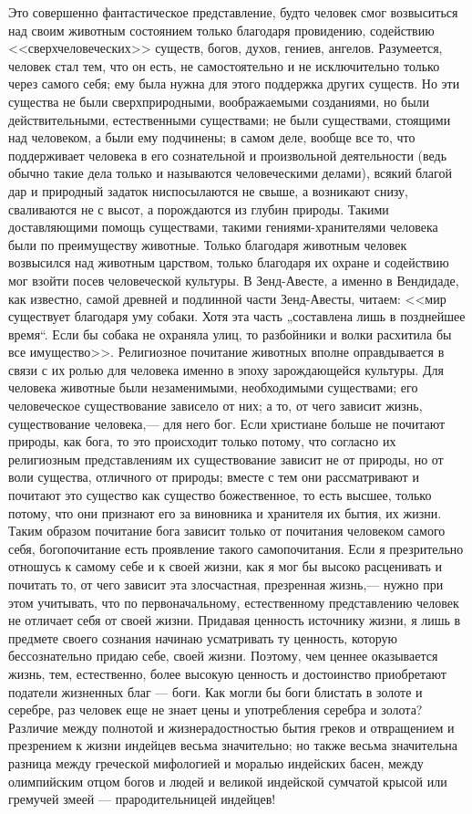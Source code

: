 \documentclass[12pt]{article}
\begin{document}
Это совершенно фантастическое представление, будто человек смог возвыситься над своим животным состоянием только благодаря провидению, содействию <<сверхчеловеческих>> существ, богов, духов, гениев, ангелов. Разумеется, человек стал тем, что он есть, не самостоятельно и не исключительно только через самого себя; ему была нужна для этого поддержка других существ. Но эти существа не были сверхприродными, воображаемыми созданиями, но были действительными, естественными существами; не были существами, стоящими над человеком, а были ему подчинены; в самом деле, вообще все то, что поддерживает человека в его сознательной и произвольной деятельности (ведь обычно такие дела только и называются человеческими делами), всякий благой дар и природный задаток ниспосылаются не свыше, а возникают снизу, сваливаются не с высот, а порождаются из глубин природы. Такими доставляющими помощь существами, такими гениями-хранителями человека были по преимуществу животные. Только благодаря животным человек возвысился над животным царством, только благодаря их охране и содействию мог взойти посев человеческой культуры. В Зенд-Авесте, а именно в Вендидаде, как известно, самой древней и подлинной части Зенд-Авесты, читаем: <<мир существует благодаря уму собаки. Хотя эта часть „составлена лишь в позднейшее время“. Если бы собака не охраняла улиц, то разбойники и волки расхитила бы все имущество>>. Религиозное почитание животных вполне оправдывается в связи с их ролью для человека именно в эпоху зарождающейся культуры. Для человека животные были незаменимыми, необходимыми существами; его человеческое существование зависело от них; а то, от чего зависит жизнь, существование человека,--- для него бог. Если христиане больше не почитают природы, как бога, то это происходит только потому, что согласно их религиозным представлениям их существование зависит не от природы, но от воли существа, отличного от природы; вместе с тем они рассматривают и почитают это существо как существо божественное, то есть высшее, только потому, что они признают его за виновника и хранителя их бытия, их жизни. Таким образом почитание бога зависит только от почитания человеком самого себя, богопочитание есть проявление такого самопочитания. Если я презрительно отношусь к самому себе и к своей жизни, как я мог бы высоко расценивать и почитать то, от чего зависит эта злосчастная, презренная жизнь,--- нужно при этом учитывать, что по первоначальному, естественному представлению человек не отличает себя от своей жизни. Придавая ценность источнику жизни, я лишь в предмете своего сознания начинаю усматривать ту ценность, которую бессознательно придаю себе, своей жизни. Поэтому, чем ценнее оказывается жизнь, тем, естественно, более высокую ценность и достоинство приобретают податели жизненных благ --- боги. Как могли бы боги блистать в золоте и серебре, раз человек еще не знает цены и употребления серебра и золота? Различие между полнотой и жизнерадостностью бытия греков и отвращением и презрением к жизни индейцев весьма значительно; но также весьма значительна разница между греческой мифологией и моралью индейских басен, между олимпийским отцом богов и людей и великой индейской сумчатой крысой или гремучей змеей --- прародительницей индейцев!
\end{document}
